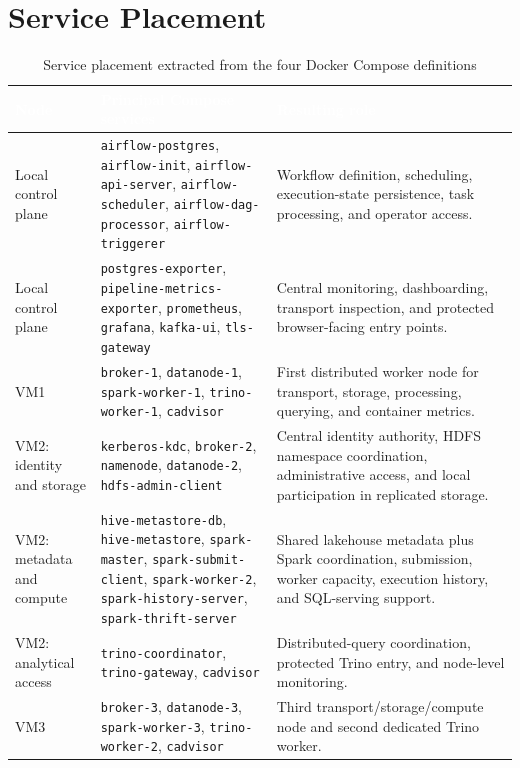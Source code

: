 \section{Service Placement}

\begin{table}[H]
    \centering
    \scriptsize
    \renewcommand{\arraystretch}{1.12}
    \begin{tabularx}{\textwidth}{|L{2.3cm}|L{5.6cm}|Y|}
        \hline
        \textcolor{white}{\textbf{Node}} & \textcolor{white}{\textbf{Principal Compose services}} & \textcolor{white}{\textbf{Resulting role}} \\
        \hline
        Local control plane & \texttt{airflow-postgres}, \texttt{airflow-init}, \texttt{airflow-api-server}, \texttt{airflow-scheduler}, \texttt{airflow-dag-processor}, \texttt{airflow-triggerer} & Workflow definition, scheduling, execution-state persistence, task processing, and operator access. \\
        \hline
        Local control plane & \texttt{postgres-exporter}, \texttt{pipeline-metrics-exporter}, \texttt{prometheus}, \texttt{grafana}, \texttt{kafka-ui}, \texttt{tls-gateway} & Central monitoring, dashboarding, transport inspection, and protected browser-facing entry points. \\
        \hline
        VM1 & \texttt{broker-1}, \texttt{datanode-1}, \texttt{spark-worker-1}, \texttt{trino-worker-1}, \texttt{cadvisor} & First distributed worker node for transport, storage, processing, querying, and container metrics. \\
        \hline
        VM2: identity and storage & \texttt{kerberos-kdc}, \texttt{broker-2}, \texttt{namenode}, \texttt{datanode-2}, \texttt{hdfs-admin-client} & Central identity authority, HDFS namespace coordination, administrative access, and local participation in replicated storage. \\
        \hline
        VM2: metadata and compute & \texttt{hive-metastore-db}, \texttt{hive-metastore}, \texttt{spark-master}, \texttt{spark-submit-client}, \texttt{spark-worker-2}, \texttt{spark-history-server}, \texttt{spark-thrift-server} & Shared lakehouse metadata plus Spark coordination, submission, worker capacity, execution history, and SQL-serving support. \\
        \hline
        VM2: analytical access & \texttt{trino-coordinator}, \texttt{trino-gateway}, \texttt{cadvisor} & Distributed-query coordination, protected Trino entry, and node-level monitoring. \\
        \hline
        VM3 & \texttt{broker-3}, \texttt{datanode-3}, \texttt{spark-worker-3}, \texttt{trino-worker-2}, \texttt{cadvisor} & Third transport/storage/compute node and second dedicated Trino worker. \\
        \hline
    \end{tabularx}
    \caption{Service placement extracted from the four Docker Compose definitions}
    \label{tab:appendix-compose-placement}
\end{table}
\FloatBarrier

